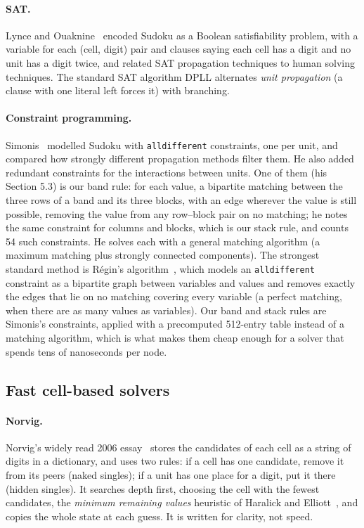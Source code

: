 \documentclass[11pt]{article}
\theoremstyle{definition}
\theoremstyle{plain}
\begin{document}
\paragraph{SAT.} Lynce and Ouaknine~\cite{lynce2006sudoku} encoded Sudoku as a Boolean satisfiability problem, with
a variable for each (cell, digit) pair and clauses saying each cell has a digit and no unit has a digit twice, and related SAT propagation techniques to human solving techniques. The standard SAT algorithm DPLL
alternates \emph{unit propagation} (a clause with one literal left forces it) with branching.

\paragraph{Constraint programming.} Simonis~\cite{simonis2005sudoku} modelled Sudoku with \texttt{alldifferent}
constraints, one per unit, and compared how strongly different propagation methods filter them. He also added
redundant constraints for the interactions between units. One of them (his Section 5.3) is our band rule: for each
value, a bipartite matching between the three rows of a band and its three blocks, with an edge wherever the value is
still possible, removing the value from any row--block pair on no matching; he notes the same constraint for columns
and blocks, which is our stack rule, and counts 54 such constraints. He solves each with a general matching algorithm
(a maximum matching plus strongly connected components). The strongest
standard method is R\'egin's algorithm~\cite{regin1994filtering}, which models an \texttt{alldifferent} constraint as a
bipartite graph between variables and values and removes exactly the edges that lie on no matching covering every variable (a perfect matching, when there are as many values as variables). Our band and stack rules are Simonis's constraints, applied
with a precomputed 512-entry table instead of a matching algorithm, which is what makes them cheap enough for a
solver that spends tens of nanoseconds per node.

\subsection{Fast cell-based solvers}

\paragraph{Norvig.} Norvig's widely read 2006 essay~\cite{norvig2006sudoku} stores the candidates of each cell as a
string of digits in a dictionary, and uses two rules: if a cell has one candidate, remove it from its peers (naked
singles); if a unit has one place for a digit, put it there (hidden singles). It searches depth first, choosing the
cell with the fewest candidates, the \emph{minimum remaining values} heuristic of Haralick and
Elliott~\cite{haralick1980increasing}, and copies the whole state at each guess. It is written for clarity, not speed.
\end{document}
